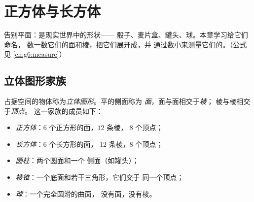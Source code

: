 \chapter{正方体与长方体}\label{ch:g5:solids}

告别平面：是现实世界中的形状——
骰子、麦片盒、罐头、球。本章学习给它们命名，
数一数它们的面和棱，把它们展开成，并
通过数小来测量它们的。（公式见
\cref{ch:g6:measure}）

\section{立体图形家族}

\begin{definition}[立体图形及其相关词汇]\label{def:g5:solids:def}
占据空间的物体称为\emph{立体图形}。平的侧面称为
\emph{面}，面与面相交于\emph{棱}；
棱与棱相交于\emph{顶点}。
这一家族的成员如下：
\begin{itemize}
  \item \emph{正方体}：$6$ 个正方形的面，$12$ 条棱，
        $8$ 个顶点；
  \item \emph{长方体}：$6$ 个长方形的面，
        $12$ 条棱，$8$ 个顶点；
  \item \emph{圆柱}：两个圆面和一个
        侧面（如罐头）；
  \item \emph{棱锥}：一个底面和若干三角形，它们交于
        同一个顶点；
  \item \emph{球}：一个完全圆滑的曲面，
        没有面，没有棱。
\end{itemize}
\end{definition}

